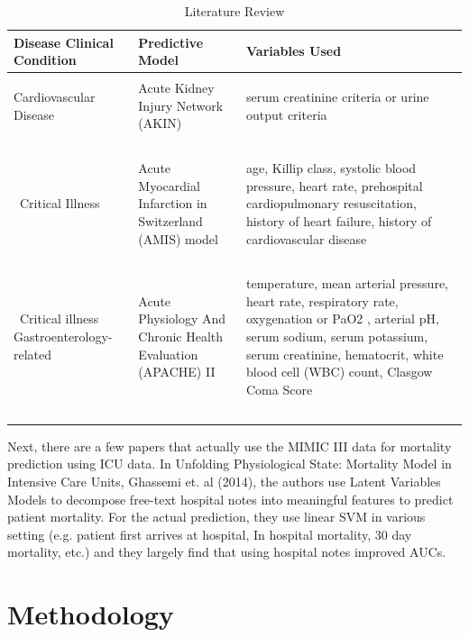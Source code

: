 \documentclass[12pt, final]{article}
\begin{document}
\begin{table}[H]
\footnotesize
{}%
\caption{Literature Review}
\label{Literature Review}
\centering
\begin{tabularx}{\textwidth}{l C C}\hline
Disease Clinical Condition & Predictive Model & Variables Used \\ \hline
 &  &   \\
Cardiovascular Disease & Acute Kidney Injury Network (AKIN) & serum creatinine criteria or urine output criteria \\\
\\\
Critical Illness & Acute Myocardial Infarction in Switzerland (AMIS) model & age, Killip class, systolic blood pressure, heart rate, prehospital cardiopulmonary resuscitation, history of heart failure, history of cardiovascular disease \\\
\\\
Critical illness Gastroenterology-related & Acute Physiology And Chronic Health Evaluation (APACHE) II & temperature, mean arterial pressure, heart rate, respiratory rate, oxygenation or PaO2 , arterial pH, serum sodium, serum potassium, serum creatinine, hematocrit, white blood cell (WBC) count, Clasgow Coma Score\\\
\end{tabularx}
\end{table}

Next, there are a few papers that actually use the MIMIC III data for mortality prediction using ICU data. In Unfolding Physiological State: Mortality Model in Intensive Care Units, Ghassemi et. al (2014)\cite{Ghassemi}, the authors use Latent Variables Models to decompose free-text hospital notes into meaningful features to predict patient mortality. For the actual prediction, they use linear SVM in various setting (e.g. patient first arrives at hospital, In hospital mortality, 30 day mortality, etc.) and they largely find that using hospital notes improved AUCs.

\section{Methodology}
\label{Methodology}
\end{document}
